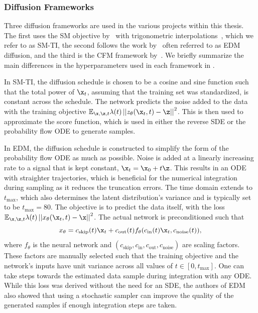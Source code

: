 \subsubsection{Diffusion Frameworks}
\label{sec:diffusion_frameworks}

Three diffusion frameworks are used in the various projects within this thesis.
The first uses the SM objective by~\textcite{GenerativeModelingEstimating} with trigonometric interpolations~\cite{StochasticInterpolants, ImprovedDenoisingDiffusion}, which we refer to as SM-TI, the second follows the work by~\textcite{ElucidatingDesignSpace} often referred to as EDM diffusion, and the third is the CFM framework by~\textcite{FlowMatchingGenerative, FlowStraightFast, BuildingNormalizingFlows}.
We briefly summarize the main differences in the hyperparameters used in each framework in .

In SM-TI, the diffusion schedule is chosen to be a cosine and sine function such that the total power of $\x_t$, assuming that the training set was standardized, is constant across the schedule.
The network predicts the noise added to the data with the training objective
$\mathbb{E}_{\x, \z, t} \lambda(t) \left|\left| z_\theta(\x_t, t) - \z\right|\right|^2$.
This is then used to approximate the score function, which is used in either the reverse SDE or the probability flow ODE to generate samples.

In EDM, the diffusion schedule is constructed to simplify the form of the probability flow ODE as much as possible.
Noise is added at a linearly increasing rate to a signal that is kept constant, $\x_t = \x_0 + t\z$.
This results in an ODE with straighter trajectories, which is beneficial for the numerical integration during sampling as it reduces the truncation errors.
The time domain extends to $t_\text{max}$, which also determines the latent distribution's variance and is typically set to be $t_\text{max} = 80$.
The objective is to predict the data itself, with the loss $\mathbb{E}_{\x, \z, t} \lambda(t) \left|\left| x_\theta(\x_t, t) - \x\right|\right|^2$.
The actual network is preconditioned such that
\begin{equation}
    x_\theta = c_\text{skip}(t) \x_t + c_\text{out}(t)f_\theta(c_\text{in}(t)\x_t, c_\text{noise}(t)),
\end{equation}
where $f_\theta$ is the neural network and $(c_\text{skip}, c_\text{in}, c_\text{out}, c_\text{noise})$ are scaling factors.
These factors are manually selected such that the training objective and the network's inputs have unit variance across all values of $t \in [0, t_\text{max}]$.
One can take steps towards the estimated data sample during integration with any ODE.
While this loss was derived without the need for an SDE, the authors of EDM also showed that using a stochastic sampler can improve the quality of the generated samples if enough integration steps are taken.

